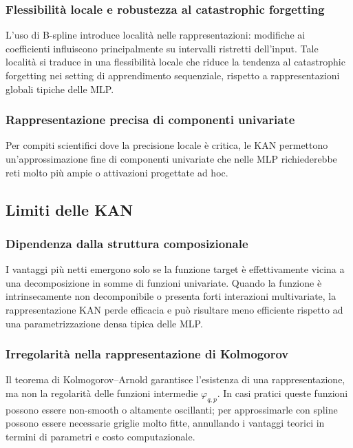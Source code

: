 \documentclass[a4paper,12pt]{report}
\begin{document}
	\subsubsection{Flessibilità locale e robustezza al catastrophic forgetting}
	L'uso di B-spline introduce località nelle rappresentazioni: modifiche ai coefficienti influiscono principalmente su intervalli ristretti dell'input. Tale località si traduce in una flessibilità locale che riduce la tendenza al catastrophic forgetting nei setting di apprendimento sequenziale, rispetto a rappresentazioni globali tipiche delle MLP.
	
	\subsubsection{Rappresentazione precisa di componenti univariate}
	Per compiti scientifici dove la precisione locale è critica, le KAN permettono un'approssimazione fine di componenti univariate che nelle MLP richiederebbe reti molto più ampie o attivazioni progettate ad hoc.
	
	\subsection{Limiti delle KAN}
	
	\subsubsection{Dipendenza dalla struttura composizionale}
	I vantaggi più netti emergono solo se la funzione target è effettivamente vicina a una decomposizione in somme di funzioni univariate. Quando la funzione è intrinsecamente non decomponibile o presenta forti interazioni multivariate, la rappresentazione KAN perde efficacia e può risultare meno efficiente rispetto ad una parametrizzazione densa tipica delle MLP.
	
	\subsubsection{Irregolarità nella rappresentazione di Kolmogorov}
	Il teorema di Kolmogorov–Arnold garantisce l'esistenza di una rappresentazione, ma non la regolarità delle funzioni intermedie \(\varphi_{q,p}\). In casi pratici queste funzioni possono essere non-smooth o altamente oscillanti; per approssimarle con spline possono essere necessarie griglie molto fitte, annullando i vantaggi teorici in termini di parametri e costo computazionale.
	
\end{document}
